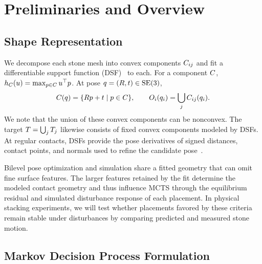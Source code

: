 \section{Preliminaries and Overview} \label{sec:overview}

\subsection{Shape Representation}
We decompose each stone mesh into convex components $C_{ij}$ and fit a differentiable support function (DSF)~\cite{lee2023uncertain} to each. For a component $C$, $h_C(u)=\max_{p\in C}u^\top p$. At pose $q=(R,t)\in\text{SE}(3)$,
\begin{equation*}
    C(q)=\{Rp+t\mid p\in C\},
    \qquad O_i(q_i)=\bigcup_jC_{ij}(q_i).
\end{equation*}
We note that the union of these convex components can be nonconvex. The target $T=\bigcup_jT_j$ likewise consists of fixed convex components modeled by DSFs.
At regular contacts, DSFs provide the pose derivatives of signed distances, contact points, and normals used to refine the candidate pose~\cite{an2024riemannianmtd}.

Bilevel pose optimization and simulation share a fitted geometry that can omit fine surface features. The larger features retained by the fit determine the modeled contact geometry and thus influence MCTS through the equilibrium residual and simulated disturbance response of each placement.
In physical stacking experiments, we will test whether placements favored by these criteria remain stable under disturbances by comparing predicted and measured stone motion.


\subsection{Markov Decision Process Formulation}

